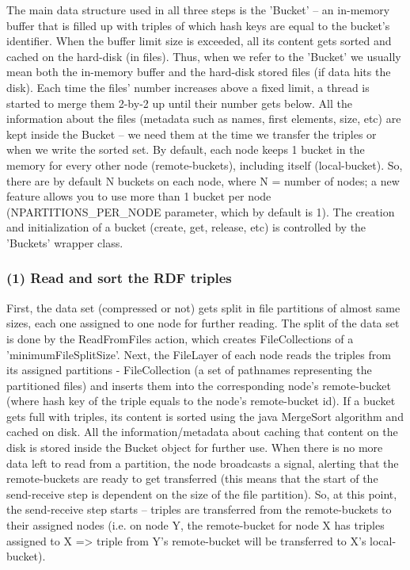 The main data structure used in all three steps is the 'Bucket' -- an in-memory buffer that is filled up with triples of which hash keys are equal to the bucket's identifier. When the buffer limit size is exceeded, all its content gets sorted and cached on the hard-disk (in files). Thus, when we refer to the 'Bucket' we usually mean both the in-memory buffer and the hard-disk stored files (if data hits the disk). Each time the files' number increases above a fixed limit, a thread is started to merge them 2-by-2 up until their number gets below. All the information about the files (metadata such as names, first elements, size, etc) are kept inside the Bucket -- we need them at the time we transfer the triples or when we write the sorted set. By default, each node keeps 1 bucket in the memory for every other node (remote-buckets), including itself (local-bucket). So, there are by default N buckets on each node, where N = number of nodes; a new feature allows you to use more than 1 bucket per node (NPARTITIONS\_PER\_NODE parameter, which by default is 1). The creation and initialization of a bucket (create, get, release, etc) is controlled by the 'Buckets' wrapper class.

% 
\subsubsection*{(1) Read and sort the RDF triples}

First, the data set (compressed or not) gets split in file partitions of almost same sizes, each one assigned to one node for further reading. The split of the data set is done by the ReadFromFiles action, which creates FileCollections of a 'minimumFileSplitSize'. Next, the FileLayer of each node reads the triples from its assigned partitions - FileCollection (a set of pathnames representing the partitioned files) and inserts them into the corresponding node's remote-bucket (where hash key of the triple equals to the node's remote-bucket id). If a bucket gets full with triples, its content is sorted using the java MergeSort algorithm and cached on disk. All the information/metadata about caching that content on the disk is stored inside the Bucket object for further use. When there is no more data left to read from a partition, the node broadcasts a signal, alerting that the remote-buckets are ready to get transferred (this means that the start of the send-receive step is dependent on the size of the file partition). So, at this point, the send-receive step starts -- triples are transferred from the remote-buckets to their assigned nodes (i.e. on node Y, the remote-bucket for node X has triples assigned to X => triple from Y's remote-bucket will be transferred to X's local-bucket).

